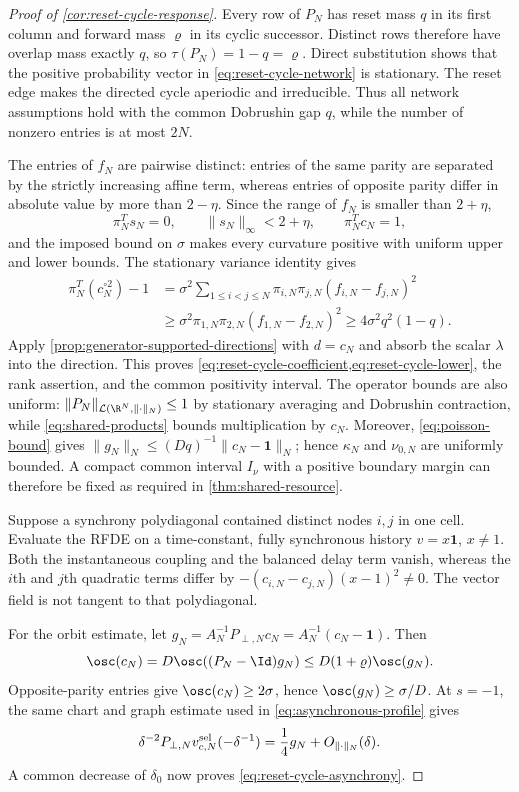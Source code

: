 \begin{proof}[Proof of \cref{cor:reset-cycle-response}]
Every row of \(P_N\) has reset mass \(q\) in its first column and forward
mass \(\varrho\) in its cyclic successor.  Distinct rows therefore have
overlap mass exactly \(q\), so
\(\tau(P_N)=1-q=\varrho\).  Direct substitution shows that the positive
probability vector in \cref{eq:reset-cycle-network} is stationary.  The reset
edge makes the directed cycle aperiodic and irreducible.  Thus all network
assumptions hold with the common Dobrushin gap \(q\), while the number of
nonzero entries is at most \(2N\).

The entries of \(f_N\) are pairwise distinct: entries of the same parity are
separated by the strictly increasing affine term, whereas entries of opposite
parity differ in absolute value by more than \(2-\eta\).  Since the range of
\(f_N\) is smaller than \(2+\eta\),
\[
 \pi_N^Ts_N=0,\qquad \|s_N\|_\infty<2+\eta,
 \qquad \pi_N^Tc_N=1,
\]
and the imposed bound on \(\sigma\) makes every curvature positive with
uniform upper and lower bounds.  The stationary variance identity gives
\begin{align*}
 \pi_N^T(c_N^{\circ2})-1
 &=\sigma^2\sum_{1\le i<j\le N}
       \pi_{i,N}\pi_{j,N}(f_{i,N}-f_{j,N})^2\\
 &\ge \sigma^2\pi_{1,N}\pi_{2,N}
       (f_{1,N}-f_{2,N})^2
 \ge4\sigma^2q^2(1-q).
\end{align*}
Apply \cref{prop:generator-supported-directions} with
\(d=c_N\) and absorb the scalar \(\lambda\) into the direction.  This proves
\cref{eq:reset-cycle-coefficient,eq:reset-cycle-lower}, the rank assertion,
and the common positivity interval.  The operator bounds are also uniform:
\(\|P_N\|_{\mathcal L(\R^N,\|\cdot\|_N)}\le1\) by stationary averaging and
Dobrushin contraction, while
\cref{eq:shared-products} bounds multiplication by \(c_N\).
Moreover, \cref{eq:poisson-bound} gives
\(\|g_N\|_N\le(Dq)^{-1}\|c_N-\mathbf1\|_N\); hence
\(\kappa_N\) and \(\nu_{0,N}\) are uniformly bounded.  A compact common
interval \(I_\nu\) with a positive boundary margin can therefore be fixed as
required in \cref{thm:shared-resource}.

Suppose a synchrony polydiagonal contained distinct nodes \(i,j\) in one
cell.  Evaluate the RFDE on a time-constant, fully synchronous history
\(v=x\mathbf1\), \(x\ne1\).  Both the instantaneous coupling and the balanced
delay term vanish, whereas the \(i\)th and \(j\)th quadratic terms differ by
\(-(c_{i,N}-c_{j,N})(x-1)^2\ne0\).  The vector field is not tangent to that
polydiagonal.

For the orbit estimate, let
\(g_N=A_N^{-1}P_{\perp,N}c_N=A_N^{-1}(c_N-\mathbf1)\).  Then
\[
 \osc(c_N)
 =D\osc((P_N-\Id)g_N)
 \le D(1+\varrho)\osc(g_N).
\]
Opposite-parity entries give \(\osc(c_N)\ge2\sigma\), hence
\(\osc(g_N)\ge\sigma/D\).  At \(s=-1\), the same chart and graph estimate used
in \cref{eq:asynchronous-profile} gives
\[
 \delta^{-2}P_{\perp,N}v^{\rm sel}_{c,N}(-\delta^{-1})
 =\frac14g_N+O_{\|\cdot\|_N}(\delta).
\]
A common decrease of \(\delta_0\) now proves
\cref{eq:reset-cycle-asynchrony}.
\end{proof}

